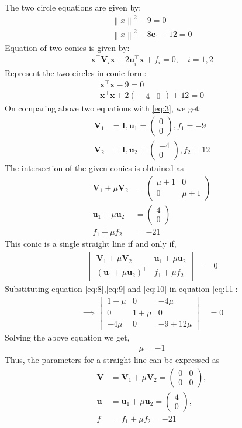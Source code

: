 \documentclass[12pt]{article}
\providecommand{\norm}[1]{\left\lVert#1\right\rVert}
\newcommand{\myvec}[1]{\ensuremath{\begin{pmatrix}#1\end{pmatrix}}}
\let\vec\mathbf
\let\vec\mathbf
\newcommand{\mydet}[1]{\ensuremath{\begin{vmatrix}#1\end{vmatrix}}}
\providecommand{\norm}[1]{\left\lVert#1\right\rVert}
\let\vec\mathbf
\begin{document}
 The two circle equations are given by:
\begin{align}
\label{eq:1}
	\norm{x}^2-9=0\\
	\norm{x}^2-8\vec{e}_1+12=0
\end{align}
Equation of two conics is given by:
 \begin{align}
 \vec{x}^\top\vec{V}_i\vec{x}+2\vec{u}_i^\top\vec{x}+f_i=0, \quad i=1,2
 \label{eq:3}
 \end{align}
 Represent the two circles in conic form:
 \begin{align}
	\vec{x}^\top\vec{x}-9=0\\
	\vec{x}^\top\vec{x}+2\myvec{-4&0}+12=0
\end{align}
On comparing above two equations with \eqref{eq:3}, we get:
 \begin{align}
	  \vec{V}_1&=\vec{I},\vec{u}_1=\myvec{0\\0},f_1=-9\\
	  \vec{V}_2&=\vec{I},\vec{u}_2=\myvec{-4\\0},f_2=12
\end{align}
The intersection of the given conics is obtained
as
\begin{align}
	\label{eq:8}
\vec{V}_1+\mu\vec{V}_2&= \myvec{
\mu+1 & 0\\
0 & \mu+1
}
\\ \label{eq:9}
\vec{u}_1+\mu\vec{u}_2&= \myvec{
4\\
0
}
\\ \label{eq:10}
f_1+\mu f_2&= -21
\end{align}
This conic is a single straight line if and only if, 
\begin{align}
\mydet{\vec{V}_1 + \mu\vec{V}_2 & \vec{u}_1+\mu \vec{u}_2\\ (\vec{u}_1+\mu \vec{u}_2)^{\top} & f_1 + \mu f_2} &= 0
\label{eq:11}
\end{align}
Substituting equation \eqref{eq:8},\eqref{eq:9} and \eqref{eq:10} in equation \eqref{eq:11}:
\begin{align}
\implies \mydet{1+\mu& 0 & -4\mu\\ 
0 & 1+\mu & 0 \\
-4\mu & 0 & -9+12\mu
} &= 0
\end{align}
Solving the above equation we get,
\begin{align}
    \mu = -1
\end{align}
Thus, the parameters for a straight line can be expressed as
 \begin{align}
 \label{eq:14}
	\vec{V} &= 
\vec{V}_1 + \mu\vec{V}_2
=\myvec{ 0 & 0 \\ 0 & 0},
\\ \label{eq:15}
	\vec{u} &=
\vec{u}_1+\mu \vec{u}_2
	= \myvec{
4\\
0
},
\\ \label{eq:16}
f&=f_1 + \mu f_2=-21
\end{align}
\end{document}
